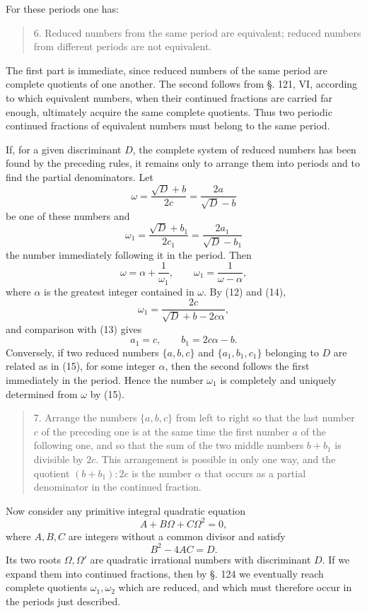 \documentclass[11pt]{article}
\begin{document}
For these periods one has:
\begin{quote}
6. Reduced numbers from the same period are equivalent; reduced numbers from different periods are not equivalent.
\end{quote}
The first part is immediate, since reduced numbers of the same period are complete quotients of one another. The second follows from §. 121, VI, according to which equivalent numbers, when their continued fractions are carried far enough, ultimately acquire the same complete quotients. Thus two periodic continued fractions of equivalent numbers must belong to the same period.

If, for a given discriminant $D$, the complete system of reduced numbers has been found by the preceding rules, it remains only to arrange them into periods and to find the partial denominators. Let
\[
\tag{12}       \omega=\frac{\sqrt D+b}{2c}=\frac{2a}{\sqrt D-b}
\]
be one of these numbers and
\[
\tag{13}       \omega_1=\frac{\sqrt D+b_1}{2c_1}
=\frac{2a_1}{\sqrt D-b_1}
\]
the number immediately following it in the period. Then
\[
\tag{14}       \omega=\alpha+\frac1{\omega_1},\qquad
        \omega_1=\frac1{\omega-\alpha},
\]
where $\alpha$ is the greatest integer contained in $\omega$. By (12) and (14),
\[
        \omega_1=\frac{2c}{\sqrt D+b-2c\alpha},
\]
and comparison with (13) gives
\[
\tag{15}       a_1=c,\qquad b_1=2c\alpha-b.
\]
Conversely, if two reduced numbers $\{a,b,c\}$ and $\{a_1,b_1,c_1\}$ belonging to $D$ are related as in (15), for some integer $\alpha$, then the second follows the first immediately in the period. Hence the number $\omega_1$ is completely and uniquely determined from $\omega$ by (15).

\begin{quote}
7. Arrange the numbers $\{a,b,c\}$ from left to right so that the last number $c$ of the preceding one is at the same time the first number $a$ of the following one, and so that the sum of the two middle numbers $b+b_1$ is divisible by $2c$. This arrangement is possible in only one way, and the quotient $(b+b_1):2c$ is the number $\alpha$ that occurs as a partial denominator in the continued fraction.
\end{quote}

Now consider any primitive integral quadratic equation
\[
\tag{16}       A+B\Omega+C\Omega^2=0,
\]
where $A,B,C$ are integers without a common divisor and satisfy
\[
        B^2-4AC=D.
\]
Its two roots $\Omega,\Omega'$ are quadratic irrational numbers with discriminant $D$. If we expand them into continued fractions, then by §. 124 we eventually reach complete quotients $\omega_1,\omega_2$ which are reduced, and which must therefore occur in the periods just described.
\end{document}
